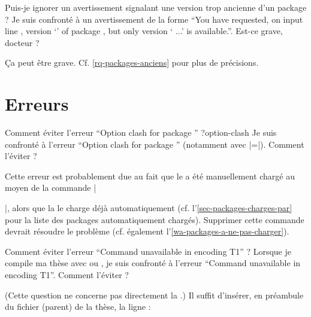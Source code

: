 \begin{dbfaq}{Puis-je ignorer un avertissement signalant une version trop
    ancienne d'un package ?}{}
  Je suis confronté à un avertissement de la forme \enquote{You have requested,
    on input line , version `' of package
    , but only version ` ...'
    is available.}. Est-ce grave, docteur ?
\end{dbfaq}

Ça peut être grave. Cf. \vref{rq-packages-anciens} pour plus de précisions.

\section{Erreurs}
\label{sec-erreurs}%
%
%

\begin{dbfaq}{Comment éviter l'erreur \enquote{Option clash for package
      } ?}{option-clash}
  Je suis confronté à l'erreur \enquote{Option clash for package }
  (notamment avec |=|). Comment l'éviter ?
\end{dbfaq}

Cette erreur est probablement due au fait que le  a été
manuellement chargé au moyen de la commande
|\usepackage[...]{|\meta{package}|}|, alors que la \yatCl{} le charge déjà
automatiquement (cf. l'\vref{sec-packages-charges-par} pour la liste des
packages automatiquement chargés). Supprimer cette commande devrait résoudre le
problème (cf. également l'\vref{wa-packages-a-ne-pas-charger}).

\begin{dbfaq}{Comment éviter l'erreur \enquote{Command
      \protect{} unavailable in encoding T1} ?}{}
  Lorsque je compile ma thèse avec  ou , je
  suis confronté à l'erreur \enquote{Command 
    unavailable in encoding T1}. Comment l'éviter ?
\end{dbfaq}

(Cette question ne concerne pas directement la \yatCl{}.) Il suffit
d'insérer, en préambule du fichier (parent) de la thèse, la ligne :
\begin{preamblecode}[title=Par exemple dans le \File{\configurationfile}]
\end{preamblecode}

